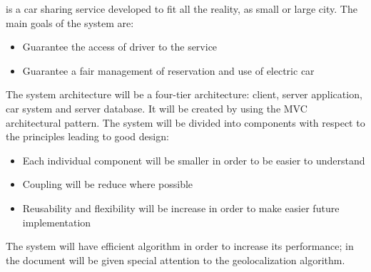 \PowerEnJoy{} is a car sharing service developed to fit all the reality, as small or large city.
The main goals of the system are:
\begin{itemize}
	\item Guarantee the access of driver to the service
	\item Guarantee a fair management of reservation and use of electric car
\end{itemize}
The system architecture will be a four-tier architecture: client, server application, car system and server database. It will be created by using the MVC architectural pattern.
The system will be divided into components with respect to the principles leading to good design:
\begin{itemize}
	\item Each individual component will be smaller in order to be easier to understand
	\item Coupling will be reduce where possible
	\item Reusability and flexibility will be increase in order to make easier future implementation
\end{itemize}
The system will have efficient algorithm in order to increase its performance;
in the document will be given special attention to the geolocalization algorithm.
